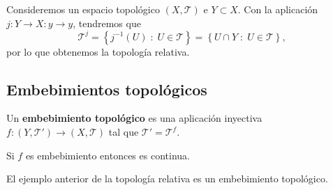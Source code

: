 \begin{eg}
Consideremos un espacio topológico $\displaystyle \left(X, \mathcal{T}\right) $ e $\displaystyle Y \subset X $. Con la aplicación $\displaystyle j : Y \to X : y \to y $, tendremos que 
\[\mathcal{T}^{j}= \left\{ j^{-1}\left(U\right) \; : \; U \in \mathcal{T}\right\} = \left\{ U \cap Y \; : \; U \in \mathcal{T}\right\}  ,\]
por lo que obtenemos la topología relativa. 
\end{eg}
\subsection{Embebimientos topológicos}

\begin{definition}
Un \textbf{embebimiento topológico} es una aplicación inyectiva $\displaystyle f : \left(Y, \mathcal{T}'\right)\to \left(X, \mathcal{T}\right) $ tal que $\displaystyle \mathcal{T}' = \mathcal{T}^{f} $. 
\end{definition}
\begin{observation}
Si $\displaystyle f $ es embebimiento entonces es continua.
\end{observation}

\begin{eg}
El ejemplo anterior de la topología relativa es un embebimiento topológico. 
\end{eg}

